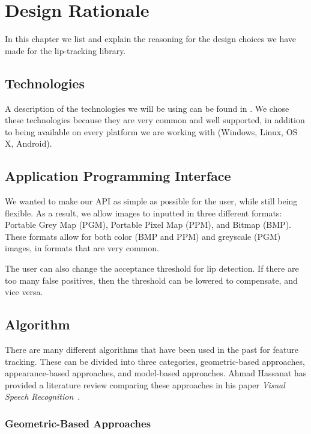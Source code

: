 \chapter{Design Rationale}

In this chapter we list and explain the reasoning for the design choices we have made for the lip-tracking library.

\section{Technologies}

A description of the technologies we will be using can be found in . We chose these technologies because they are very common and well supported, in addition to being available on every platform we are working with (Windows, Linux, OS X, Android). 

\section{Application Programming Interface}

We wanted to make our API as simple as possible for the user, while still being flexible. As a result, we allow images to inputted in three different formats: Portable Grey Map (PGM), Portable Pixel Map (PPM), and Bitmap (BMP). These formats allow for both color (BMP and PPM) and greyscale (PGM) images, in formats that are very common. 

The user can also change the acceptance threshold for lip detection. If there are too many false positives, then the threshold can be lowered to compensate, and vice versa.

\section{Algorithm}

There are many different algorithms that have been used in the past for feature tracking. 
These can be divided into three categories, geometric-based approaches, appearance-based approaches, and model-based approaches. Ahmad Hassanat has provided a literature review comparing these approaches in his paper \textit{Visual Speech Recognition}~\cite{Hassanat14}.

\subsection{Geometric-Based Approaches}


